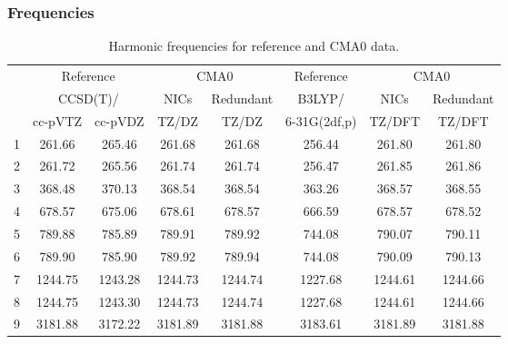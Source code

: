 \documentclass[10pt,oneside]{article}
\begin{document}
\begin{table}[h!]
\subsubsection*{Frequencies}
\centering
\caption{Harmonic frequencies for reference and CMA0 data.}
\begin{tabular}{cccccccc}
\toprule
{} & \multicolumn{2}{c}{Reference} & \multicolumn{2}{c}{CMA0} &    Reference & \multicolumn{2}{c}{CMA0} \\
{} & \multicolumn{2}{c}{CCSD(T)/} &    NICs &  Redundant &       B3LYP/ &    NICs & Redundant \\
{} &   cc-pVTZ & cc-pVDZ &   TZ/DZ &      TZ/DZ & 6-31G(2df,p) &  TZ/DFT &    TZ/DFT \\
\midrule
1 &    261.66 &  265.46 &  261.68 &     261.68 &       256.44 &  261.80 &    261.80 \\
2 &    261.72 &  265.56 &  261.74 &     261.74 &       256.47 &  261.85 &    261.86 \\
3 &    368.48 &  370.13 &  368.54 &     368.54 &       363.26 &  368.57 &    368.55 \\
4 &    678.57 &  675.06 &  678.61 &     678.57 &       666.59 &  678.57 &    678.52 \\
5 &    789.88 &  785.89 &  789.91 &     789.92 &       744.08 &  790.07 &    790.11 \\
6 &    789.90 &  785.90 &  789.92 &     789.94 &       744.08 &  790.09 &    790.13 \\
7 &   1244.75 & 1243.28 & 1244.73 &    1244.74 &      1227.68 & 1244.61 &   1244.66 \\
8 &   1244.75 & 1243.30 & 1244.73 &    1244.74 &      1227.68 & 1244.61 &   1244.66 \\
9 &   3181.88 & 3172.22 & 3181.89 &    3181.88 &      3183.61 & 3181.89 &   3181.88 \\
\bottomrule
\end{tabular}
\end{table}
\end{document}
